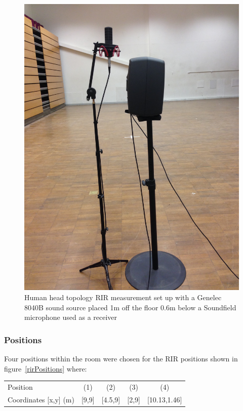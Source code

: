 \documentclass[../../main.tex]{subfiles}
\begin{document}
		\begin{figure}
			\begin{center}
				\includegraphics[scale = 0.1]{Sections/Implementation/RealRIRs/images/realRIRTopology1.jpg} 
				\caption{Human head topology \ac{RIR} measurement set up with a Genelec 8040B sound source placed 1m off the floor 0.6m below a Soundfield microphone used as a receiver}
				\label{realRIRTop}
			\end{center}
		\end{figure}

	\subsubsection{Positions}

		Four positions within the room were chosen for the \ac{RIR} positions shown in figure~\ref{rirPositions} where:

		\begin{center}
			\begin{tabular}{l| c c c c}
				Position & (1) & (2) & (3) & (4) \\
				Coordinates [x,y] (m) & [9,9] & [4.5,9] & [2,9] &  [10.13,1.46]\\
			\end{tabular}
		\end{center}
\end{document}
